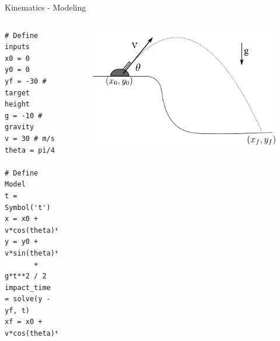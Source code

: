 \documentclass[compress, blue]{beamer}
\begin{document}
\begin{frame}{Kinematics - Modeling}
\begin{columns}

\begin{lstlisting}
# Define inputs
x0 = 0
y0 = 0
yf = -30 # target height 
g = -10 # gravity 
v = 30 # m/s
theta = pi/4

# Define Model
t = Symbol('t') 
x = x0 + v*cos(theta)*t
y = y0 + v*sin(theta)*t 
       + g*t**2 / 2
impact_time = solve(y - yf, t)
xf = x0 + v*cos(theta)*impact_time

\end{lstlisting}

    \begin{figure}
        \includegraphics[width=\textwidth]{images/cannon.pdf}
    \end{figure}
\end{columns}
\end{frame}
\end{document}
